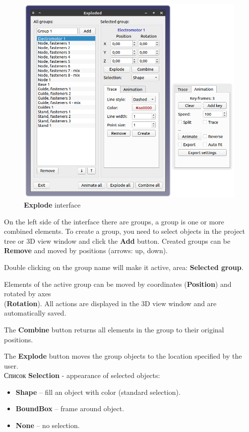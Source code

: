 \documentclass[a4paper,12pt]{article}
\begin{document}
\pagebreak

\begin{figure}[htp]
	\centering
	\includegraphics[width=1\textwidth]{img/exploded.png}
	\caption{\textbf{Explode} interface}
	\label{sec:exploded}
\end{figure}

On the left side of the interface there are groups, a group is one or more combined elements. To create a group, you need to select objects in the project tree or 3D view window and click the \textbf{Add} button. Created groups can be \textbf{Remove} and moved by positions (arrows: up, down).

Double clicking on the group name will make it active, area: \textbf{Selected group}.

Elements of the active group can be moved by coordinates (\textbf{Position}) and rotated by axes\\(\textbf{Rotation}). All actions are displayed in the 3D view window and are automatically saved.

The \textbf{Combine} button returns all elements in the group to their original positions.

The \textbf{Explode} button moves the group objects to the location specified by the user.\\

Список \textbf{Selection} - appearance of selected objects:
\begin{itemize}
	\item \textbf{Shape} -- fill an object with color (standard selection).
	\item \textbf{BoundBox} -- frame around object.
	\item \textbf{None} -- no selection.
\end{itemize}
\end{document}
